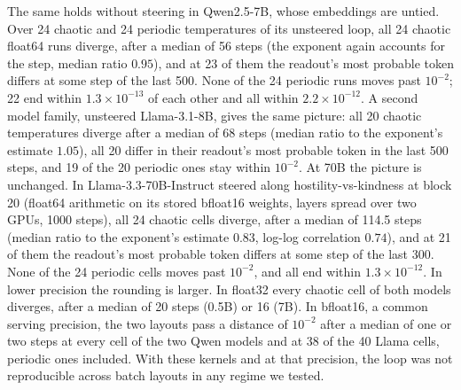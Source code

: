 \documentclass[11pt,letterpaper]{article}
\begin{document}
The same holds without steering in Qwen2.5-7B, whose embeddings are untied. Over 24 chaotic and 24 periodic
temperatures of its unsteered loop, all 24 chaotic float64 runs diverge, after a median of 56 steps (the exponent again
accounts for the step, median ratio $0.95$), and at 23 of them the readout's most probable token differs at some step
of the last 500. None of the 24 periodic runs moves past $10^{-2}$; 22 end within $1.3\times10^{-13}$ of each other
and all within $2.2\times10^{-12}$. A second model family, unsteered Llama-3.1-8B, gives the same picture: all 20
chaotic temperatures diverge after a median of 68 steps (median ratio to the exponent's estimate $1.05$), all 20 differ
in their readout's most probable token in the last 500 steps, and 19 of the 20 periodic ones stay within
$10^{-2}$. At 70B the picture is unchanged. In Llama-3.3-70B-Instruct steered along hostility-vs-kindness at block 20
(float64 arithmetic on its stored bfloat16 weights, layers spread over two GPUs, 1000 steps), all 24 chaotic cells
diverge, after a median of 114.5 steps (median ratio to the exponent's estimate $0.83$, log-log correlation $0.74$),
and at 21 of them the readout's most probable token differs at some step of the last 300. None of the 24 periodic cells moves past $10^{-2}$, and all end within
$1.3\times10^{-12}$. In lower precision the rounding is
larger. In float32 every chaotic cell of both models diverges, after a median of 20 steps (0.5B) or 16 (7B). In
bfloat16, a common serving precision, the two layouts pass a distance of $10^{-2}$ after a median of one or two steps
at every cell of the two Qwen models and at 38 of the 40 Llama cells, periodic ones included. With these kernels and at
that precision, the loop was not reproducible across batch layouts in any regime we tested.
\end{document}
